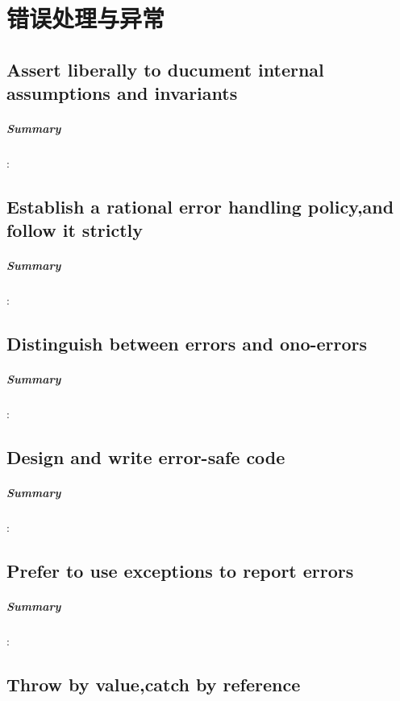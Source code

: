 \documentclass[UTF8,a4paper,12pt]{ctexbook}
\begin{document}
		
	
\chapter{错误处理与异常}
	\section{Assert liberally to ducument internal assumptions and invariants}
		\paragraph{Summary}:
		
		
	\section{Establish a rational error handling policy,and follow it strictly}
		\paragraph{Summary}:
		
		
	\section{Distinguish between errors and ono-errors}
		\paragraph{Summary}:
		
		
	\section{Design and write error-safe code}
		\paragraph{Summary}:
		
		
	\section{Prefer to use exceptions to report errors}
		\paragraph{Summary}:
		
		
	\section{Throw by value,catch by reference}
\end{document}
